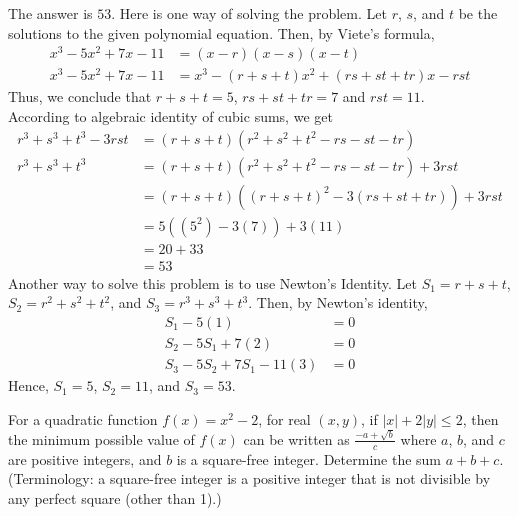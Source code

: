 \begin{solution}
The answer is $53$. Here is one way of solving the problem. Let $r$, $s$, and $t$ be the solutions to the given polynomial equation. Then, by Viete's formula,
	\begin{align*}
		x^3-5x^2+7x-11 &= (x-r)(x-s)(x-t)\\
		x^3-5x^2+7x-11 &= x^3-(r+s+t)x^2+(rs+st+tr)x-rst
	\end{align*}
	Thus, we conclude that $r+s+t=5$, $rs+st+tr=7$ and $rst=11$.\\
	\bigskip
	According to algebraic identity of cubic sums, we get
	\begin{align*}
	r^3+s^3+t^3-3rst &= (r+s+t)(r^2+s^2+t^2-rs-st-tr)\\
	r^3+s^3+t^3 &= (r+s+t)(r^2+s^2+t^2-rs-st-tr)+3rst\\
	&= (r+s+t)((r+s+t)^2-3(rs+st+tr))+3rst\\
	&=5((5^2)-3(7))+3(11)\\
	&=20+33\\
	&=53
	\end{align*}
	Another way to solve this problem is to use Newton's Identity. Let $S_1=r+s+t$, $S_2= r^2+s^2+t^2$, and $S_3=r^3+s^3+t^3$. Then, by Newton's identity,
	\begin{align*}
		S_1-5(1)&=0\\
		S_2-5S_1+7(2)&=0\\
		S_3-5S_2+7S_1-11(3)&=0
	\end{align*}
	Hence, $S_1=5$, $S_2=11$, and $S_3=53$.
\end{solution}

\begin{problem}
For a quadratic function $f(x)=x^2-2$, for real $(x,y)$, if $|x|+2|y|\leq2$, then the minimum possible value of $f(x)$ can be written as $\frac{-a+\sqrt{b}}{c}$ where $a$, $b$, and $c$ are positive integers, and $b$ is a square-free integer. Determine the sum $a+b+c$. (Terminology: a square-free integer is a positive integer that is not divisible by any perfect square (other than 1).)
\end{problem}

